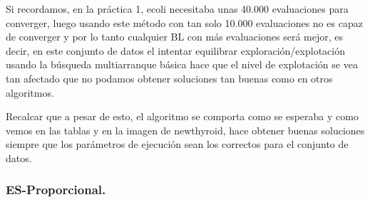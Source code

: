 \documentclass[12pt, spanish]{article}
\begin{document}
Si recordamos, en la práctica 1, ecoli necesitaba unas 40.000 evaluaciones para converger, luego usando este método con tan solo 10.000 evaluaciones no es capaz de converger y por lo tanto cualquier BL con más evaluaciones será mejor, es decir, en este conjunto de datos el intentar equilibrar exploración/explotación usando la búsqueda multiarranque básica hace que el nivel de explotación se vea tan afectado que no podamos obtener soluciones tan buenas como en otros algoritmos.

Recalcar que a pesar de esto, el algoritmo se comporta como se esperaba y como vemos en las tablas y en la imagen de newthyroid, hace obtener buenas soluciones siempre que los parámetros de ejecución sean los correctos para el conjunto de datos.

\subsubsection{ES-Proporcional.}
\end{document}
